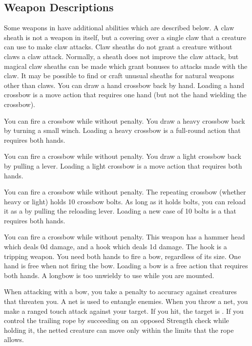     \subsection{Weapon Descriptions}
        Some weapons in  have additional abilities which are described below.
         A claw sheath is not a weapon in itself, but a covering over a single claw that a creature can use to make claw attacks. Claw sheaths do not grant a creature without claws a claw attack. Normally, a sheath does not improve the claw attack, but magical claw sheaths can be made which grant bonuses to attacks made with the claw. It may be possible to find or craft unusual sheaths for natural weapons other than claws.
         You can draw a hand crossbow back by hand. Loading a hand crossbow is a move action that requires one hand (but not the hand wielding the crossbow).
        \par You can fire a crossbow while \prone without penalty.
         You draw a heavy crossbow back by turning a small winch. Loading a heavy crossbow is a full-round action that requires both hands.
        \par You can fire a crossbow while \prone without penalty.
         You draw a light crossbow back by pulling a lever. Loading a light crossbow is a move action that requires both hands.
        \par You can fire a crossbow while \prone without penalty.
         The repeating crossbow (whether heavy or light) holds 10 crossbow bolts. As long as it holds bolts, you can reload it as a  by pulling the reloading lever. Loading a new case of 10 bolts is a  that requires both hands.
        \par You can fire a crossbow while \prone without penalty.
         This weapon has a hammer head which deals \plus0d damage, and a hook which deals \minus1d damage. The hook is a tripping weapon.
         You need both hands to fire a bow, regardless of its size. One hand is free when not firing the bow. Loading a bow is a free action that requires both hands. A longbow is too unwieldy to use while you are mounted.
        \par When attacking with a bow, you take a  penalty to accuracy against creatures that threaten you.
         A net is used to entangle enemies. When you throw a net, you make a ranged touch attack against your target. If you hit, the target is \slowed. If you control the trailing rope by succeeding on an opposed Strength check while holding it, the netted creature can move only within the limits that the rope allows.
